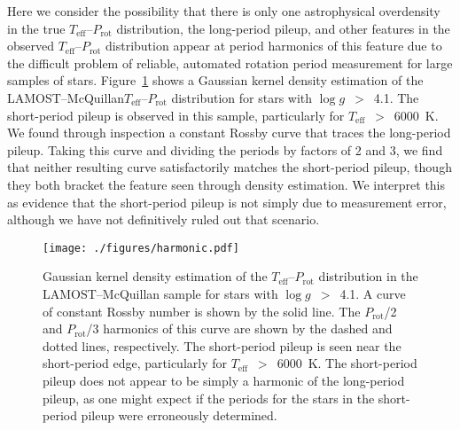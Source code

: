 \documentclass[trackchanges,twocolumn]{aastex631}
\newcommand{\lamostmcq}{LAMOST--McQuillan\xspace}
\newcommand{\teff}{\ensuremath{T_{\mathrm{eff}}}\xspace}
\newcommand{\logg}{\ensuremath{\log g}\xspace}
\newcommand{\prot}{\ensuremath{P_\mathrm{rot}}\xspace}
\begin{document}
Here we consider the possibility that there is only one astrophysical overdensity in the true \teff–\prot distribution, the long-period pileup, and other features in the observed \teff–\prot distribution appear at period harmonics of this feature due to the difficult problem of reliable, automated rotation period measurement for large samples of stars. Figure~\ref{fig:harmonic} shows a Gaussian kernel density estimation of the \lamostmcq \teff–\prot distribution for stars with \logg~$>$~4.1. The short-period pileup is observed in this sample, particularly for \teff~$>$~6000~K. We found through inspection a constant Rossby curve that traces the long-period pileup. Taking this curve and dividing the periods by factors of 2 and 3, we find that neither resulting curve satisfactorily matches the short-period pileup, though they both bracket the feature seen through density estimation. We interpret this as evidence that the short-period pileup is not simply due to measurement error, although we have not definitively ruled out that scenario.

\begin{figure}
    \centering
    \texttt{[image: ./figures/harmonic.pdf]}
    \caption{Gaussian kernel density estimation of the \teff–\prot distribution in the \lamostmcq sample for stars with \logg~$>$~4.1. A curve of constant Rossby number is shown by the solid line. The \prot/2 and \prot/3 harmonics of this curve are shown by the dashed and dotted lines, respectively. The short-period pileup is seen near the short-period edge, particularly for \teff~$>$~6000~K. The short-period pileup does not appear to be simply a harmonic of the long-period pileup, as one might expect if the periods for the stars in the short-period pileup were erroneously determined.}
    \label{fig:harmonic}
\end{figure}
\end{document}
